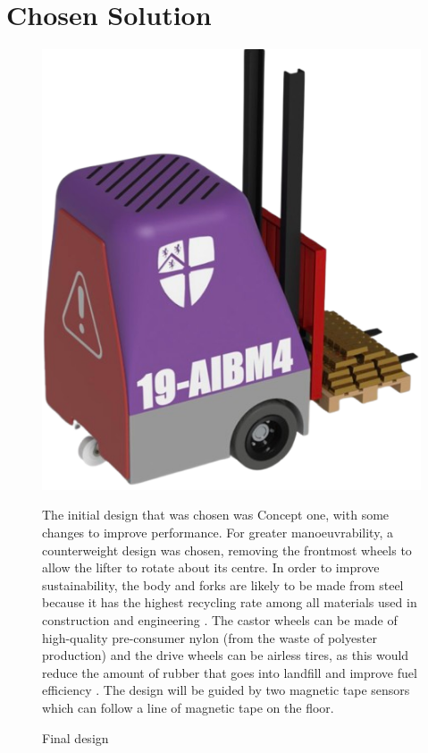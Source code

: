 \documentclass[12pt]{article}
\begin{document}
\section{Chosen Solution}
\begin{figure}[ht]
    \centering
    \begin{minipage}[t]{0.27\textwidth}
        \vspace{0pt} 
        \centering
        \includegraphics[width=\linewidth]{finaldesign1rb.png}  
        \vspace{-15pt}
        \caption{Final design}
        \label{fig:x}
    \end{minipage}%
    \hfill
    \begin{minipage}[t]{0.68\textwidth}
        \vspace{0pt}
        The initial design that was chosen was Concept one, with some changes to improve performance. For greater manoeuvrability, a counterweight design was chosen, removing the frontmost wheels to allow the lifter to rotate about its centre. In order to improve sustainability, the body and forks are likely to be made from steel because it has the highest recycling rate among all materials used in construction and engineering \cite{baker2023}. The castor wheels can be made of high-quality pre-consumer nylon (from the waste of polyester production) \cite{eco2022} and the drive wheels can be airless tires, as this would reduce the amount of rubber that goes into landfill and improve fuel efficiency \cite{ImperialTyres}. The design will be guided by two magnetic tape sensors which can follow a line of magnetic tape on the floor.
    \end{minipage}
\end{figure}
\end{document}
